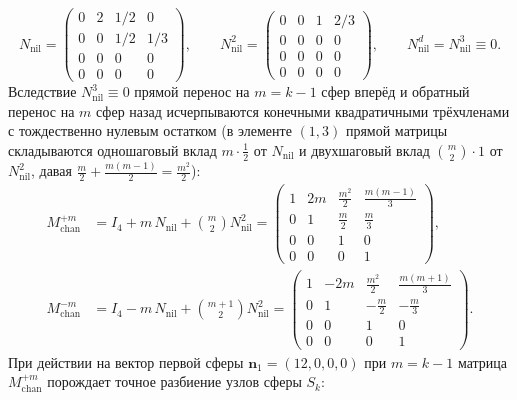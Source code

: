 \begin{theorem}
\begin{enumerate}[leftmargin=*]
\begin{equation}
  \label{eq:compute-nilpotent-generator}
    N_{\mathrm{nil}} =
    \begin{pmatrix}
      0 & 2 & 1/2 & 0 \\
      0 & 0 & 1/2 & 1/3 \\
      0 & 0 & 0 & 0 \\
      0 & 0 & 0 & 0
    \end{pmatrix},
    \qquad
    N_{\mathrm{nil}}^2 =
    \begin{pmatrix}
      0 & 0 & 1 & 2/3 \\
      0 & 0 & 0 & 0 \\
      0 & 0 & 0 & 0 \\
      0 & 0 & 0 & 0
    \end{pmatrix},
    \qquad
    N_{\mathrm{nil}}^d = N_{\mathrm{nil}}^3 \equiv 0.
  \end{equation}
  Вследствие $N_{\mathrm{nil}}^3 \equiv 0$ прямой перенос на $m = k - 1$ сфер вперёд и обратный перенос на $m$ сфер назад исчерпываются конечными квадратичными трёхчленами с тождественно нулевым остатком (в элементе $(1,3)$ прямой матрицы складываются одношаговый вклад $m\cdot\frac{1}{2}$ от $N_{\mathrm{nil}}$ и двухшаговый вклад $\binom{m}{2}\cdot 1$ от $N_{\mathrm{nil}}^2$, давая $\frac{m}{2} + \frac{m(m-1)}{2} = \frac{m^2}{2}$):
  \begin{equation}
  \label{eq:compute-forward-inverse-channel-polynomials}
  \begin{aligned}
    M_{\mathrm{chan}}^{+m} &= I_4 + m\,N_{\mathrm{nil}} + \binom{m}{2} N_{\mathrm{nil}}^2 =
    \begin{pmatrix}
      1 & 2m & \frac{m^2}{2} & \frac{m(m-1)}{3} \\
      0 & 1 & \frac{m}{2} & \frac{m}{3} \\
      0 & 0 & 1 & 0 \\
      0 & 0 & 0 & 1
    \end{pmatrix},\\
    M_{\mathrm{chan}}^{-m} &= I_4 - m\,N_{\mathrm{nil}} + \binom{m+1}{2} N_{\mathrm{nil}}^2 =
    \begin{pmatrix}
      1 & -2m & \frac{m^2}{2} & \frac{m(m+1)}{3} \\
      0 & 1 & -\frac{m}{2} & -\frac{m}{3} \\
      0 & 0 & 1 & 0 \\
      0 & 0 & 0 & 1
    \end{pmatrix}.
  \end{aligned}
  \end{equation}
  При действии на вектор первой сферы $\mathbf{n}_1 = (12,0,0,0)$ при $m = k - 1$ матрица $M_{\mathrm{chan}}^{+m}$ порождает точное разбиение узлов сферы $S_k$:

\end{enumerate}
\end{theorem}
